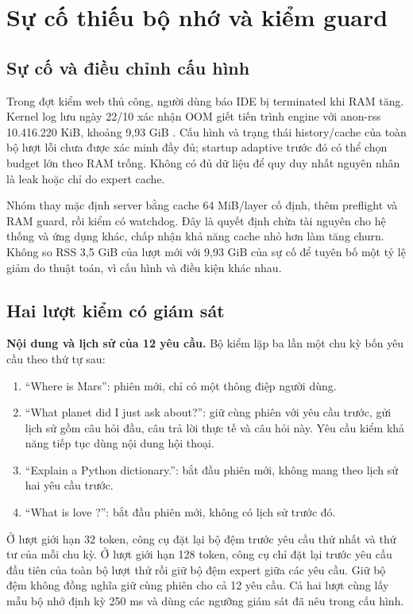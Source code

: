 \section{Sự cố thiếu bộ nhớ và kiểm guard}

\subsection{Sự cố và điều chỉnh cấu hình}

Trong đợt kiểm web thủ công, người dùng báo IDE bị terminated khi RAM tăng. Kernel log lưu ngày 22/10 xác nhận OOM giết tiến trình engine với anon-rss 10.416.220 KiB, khoảng 9,93 GiB \cite{oom_log_i5}. Cấu hình và trạng thái history/cache của toàn bộ lượt lỗi chưa được xác minh đầy đủ; startup adaptive trước đó có thể chọn budget lớn theo RAM trống. Không có đủ dữ liệu để quy duy nhất nguyên nhân là leak hoặc chỉ do expert cache.

Nhóm thay mặc định server bằng cache 64 MiB/layer cố định, thêm preflight và RAM guard, rồi kiểm có watchdog. Đây là quyết định chừa tài nguyên cho hệ thống và ứng dụng khác, chấp nhận khả năng cache nhỏ hơn làm tăng churn. Không so RSS 3,5 GiB của lượt mới với 9,93 GiB của sự cố để tuyên bố một tỷ lệ giảm do thuật toán, vì cấu hình và điều kiện khác nhau.

\subsection{Hai lượt kiểm có giám sát}

\textbf{Nội dung và lịch sử của 12 yêu cầu.} Bộ kiểm lặp ba lần một chu kỳ bốn yêu cầu theo thứ tự sau:

\begin{enumerate}
\item “Where is Mars”: phiên mới, chỉ có một thông điệp người dùng.
\item “What planet did I just ask about?”: giữ cùng phiên với yêu cầu trước, gửi lịch sử gồm câu hỏi đầu, câu trả lời thực tế và câu hỏi này. Yêu cầu kiểm khả năng tiếp tục dùng nội dung hội thoại.
\item “Explain a Python dictionary.”: bắt đầu phiên mới, không mang theo lịch sử hai yêu cầu trước.
\item “What is love ?”: bắt đầu phiên mới, không có lịch sử trước đó.
\end{enumerate}

Ở lượt giới hạn 32 token, công cụ đặt lại bộ đệm trước yêu cầu thứ nhất và thứ tư của mỗi chu kỳ. Ở lượt giới hạn 128 token, công cụ chỉ đặt lại trước yêu cầu đầu tiên của toàn bộ lượt thử rồi giữ bộ đệm expert giữa các yêu cầu. Giữ bộ đệm không đồng nghĩa giữ cùng phiên cho cả 12 yêu cầu. Cả hai lượt cùng lấy mẫu bộ nhớ định kỳ 250 ms và dùng các ngưỡng giám sát đã nêu trong cấu hình.

